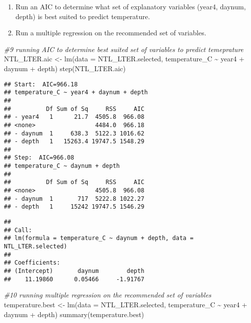 \documentclass[
]{article}
\newenvironment{Shaded}{\begin{snugshade}}{\end{snugshade}}
\newcommand{\AttributeTok}[1]{\textcolor[rgb]{0.77,0.63,0.00}{#1}}
\newcommand{\CommentTok}[1]{\textcolor[rgb]{0.56,0.35,0.01}{\textit{#1}}}
\newcommand{\FunctionTok}[1]{\textcolor[rgb]{0.00,0.00,0.00}{#1}}
\newcommand{\NormalTok}[1]{#1}
\newcommand{\OtherTok}[1]{\textcolor[rgb]{0.56,0.35,0.01}{#1}}
\newcommand{\SpecialCharTok}[1]{\textcolor[rgb]{0.00,0.00,0.00}{#1}}
\begin{document}
\begin{enumerate}
\def\labelenumi{\arabic{enumi}.}
\setcounter{enumi}{8}
\item
  Run an AIC to determine what set of explanatory variables (year4,
  daynum, depth) is best suited to predict temperature.
\item
  Run a multiple regression on the recommended set of variables.
\end{enumerate}

\begin{Shaded}
\begin{Highlighting}[]
\CommentTok{\#9 running AIC to determine best suited set of variables to predict temeprature }
\NormalTok{NTL\_LTER.aic }\OtherTok{\textless{}{-}} \FunctionTok{lm}\NormalTok{(}\AttributeTok{data =}\NormalTok{ NTL\_LTER.selected, temperature\_C }\SpecialCharTok{\textasciitilde{}}\NormalTok{ year4 }\SpecialCharTok{+}\NormalTok{ daynum }\SpecialCharTok{+}\NormalTok{ depth)}
\FunctionTok{step}\NormalTok{(NTL\_LTER.aic)}
\end{Highlighting}
\end{Shaded}

\begin{verbatim}
## Start:  AIC=966.18
## temperature_C ~ year4 + daynum + depth
## 
##          Df Sum of Sq     RSS     AIC
## - year4   1      21.7  4505.8  966.08
## <none>                 4484.0  966.18
## - daynum  1     638.3  5122.3 1016.62
## - depth   1   15263.4 19747.5 1548.29
## 
## Step:  AIC=966.08
## temperature_C ~ daynum + depth
## 
##          Df Sum of Sq     RSS     AIC
## <none>                 4505.8  966.08
## - daynum  1       717  5222.8 1022.27
## - depth   1     15242 19747.5 1546.29
\end{verbatim}

\begin{verbatim}
## 
## Call:
## lm(formula = temperature_C ~ daynum + depth, data = NTL_LTER.selected)
## 
## Coefficients:
## (Intercept)       daynum        depth  
##    11.19860      0.05466     -1.91767
\end{verbatim}

\begin{Shaded}
\begin{Highlighting}[]
\CommentTok{\#10 running multiple regression on the recommended set of variables}
\NormalTok{temperature.best }\OtherTok{\textless{}{-}} \FunctionTok{lm}\NormalTok{(}\AttributeTok{data =}\NormalTok{ NTL\_LTER.selected, temperature\_C }\SpecialCharTok{\textasciitilde{}}\NormalTok{ year4 }\SpecialCharTok{+}\NormalTok{ daynum }\SpecialCharTok{+}\NormalTok{ depth)}
\FunctionTok{summary}\NormalTok{(temperature.best)}
\end{Highlighting}
\end{Shaded}
\end{document}
